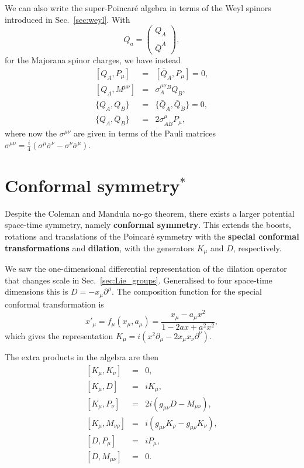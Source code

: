\documentclass[notes.tex]{subfiles}
\begin{document}
We can also write the super-Poincaré algebra in terms of the Weyl spinors introduced in Sec.~\ref{sec:weyl}. With 
\begin{equation}
Q_a=\begin{pmatrix} Q_A\\ \bar{Q}^{\dot{A}} \end{pmatrix},
\end{equation}
for the Majorana spinor charges, we have instead
\begin{eqnarray}
\left[Q_A, P_\mu\right] &=& [\bar{Q}_{\dot{A}}, P_\mu] = 0, \label{eq:QPweyl}\\
\left[Q_A, M^{\mu \nu}\right] &=& \sigma^{\mu\nu}_A{}^B Q_B,  \label{eq:QMweyl}\\
\{Q_A, Q_B\} &=& \{\bar{Q}_{\dot{A}}, \bar{Q}_{\dot{B}}\} = 0,\label{eq:QQweyl}\\
\{Q_A, \bar{Q}_{\dot{B}}\} &=& 2\sigma^\mu_{A\dot{B}}P_\mu, \label{eq:QQbarweyl}
\end{eqnarray}
where now the  $\sigma^{\mu\nu}$ are given in terms of the Pauli matrices $\sigma^{\mu\nu} = \frac{i}{4}(\sigma^\mu \bar{\sigma}^\nu - \sigma^\nu \bar{\sigma}^\mu)$.



\section{Conformal symmetry$^*$}
Despite the Coleman and Mandula no-go theorem, there exists a larger potential space-time symmetry, namely {\bf conformal symmetry}. This extends the boosts, rotations and translations of the Poincaré symmetry with the {\bf special conformal transformations} and {\bf dilation},  with the generators $K_\mu$ and $D$, respectively. 

We saw the one-dimensional differential representation of the dilation operator that changes scale in Sec.~\ref{sec:Lie_groups}. Generalised to four space-time dimensions this is $D=-x_\mu\partial^\mu$. The composition function for the special conformal transformation is
\begin{equation}
x'_\mu=f_\mu(x_\mu,a_\mu)=\frac{x_\mu-a_\mu x^2}{1-2ax+a^2x^2},
\end{equation}
which gives the representation $K_\mu=i(x^2\partial_\mu-2x_\mu x_\nu\partial^\nu)$.

The extra products in the algebra are then
\begin{eqnarray}
\left[K_\mu, K_\nu \right] &=& 0, \\
\left[K_\mu, D \right] &=& iK_\mu, \\
\left[K_\mu, P_\nu \right] &=& 2i(g_{\mu\nu}D-M_{\mu\nu}), \\
\left[K_\mu, M_{\nu\rho} \right] &=& i(g_{\mu\nu}K_\rho-g_{\mu\rho}K_\nu), \\
\left[D, P_\mu \right] &=& iP_\mu, \\
\left[D, M_{\mu\nu}\right] &=& 0.
\end{eqnarray}
\end{document}
